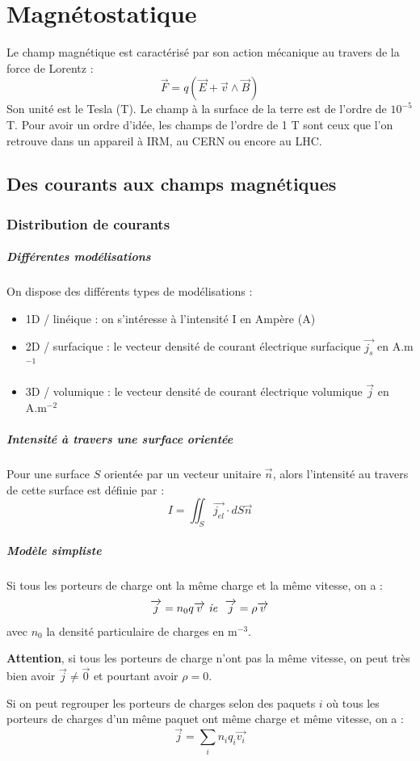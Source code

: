\documentclass[french]{book}
\theoremstyle{plain}
\theoremstyle{definition}
\theoremstyle{remark}
\newcommand{\inv}{^{-1}}
\begin{document}
\chapter{Magnétostatique}
\localtableofcontents
Le champ magnétique est caractérisé par son action mécanique au travers de la force de Lorentz : $$\overrightarrow{F}=q\left(\overrightarrow{E}+\overrightarrow{v}\wedge\overrightarrow{B}\right)$$ Son unité est le Tesla (T). Le champ à la surface de la terre est de l'ordre de $10^{-5}$ T. Pour avoir un ordre d'idée, les champs de l'ordre de 1 T sont ceux que l'on retrouve dans un appareil à IRM, au CERN ou encore au LHC.
\section{Des courants aux champs magnétiques}
\subsection{Distribution de courants}
\paragraph{Différentes modélisations}
On dispose des différents types de modélisations : 
\begin{itemize}
	\item 1D / linéique : on s'intéresse à l'intensité I en Ampère (A)
	\item 2D / surfacique : le vecteur densité de courant électrique surfacique $\overrightarrow{j_s}$ en A.m$\inv$
	\item 3D / volumique : le vecteur densité de courant électrique volumique $\overrightarrow{j}$ en A.m$^{-2}$
\end{itemize}
\paragraph{Intensité à travers une surface orientée} Pour une surface $S$ orientée par un vecteur unitaire $\overrightarrow{n}$, alors l'intensité au travers de cette surface est définie par :
$$I=\iint_S\overrightarrow{j_{el}}\cdot dS\overrightarrow{n}$$
\paragraph{Modèle simpliste} Si tous les porteurs de charge ont la même charge et la même vitesse, on a : $$\overrightarrow{j}=n_0q\overrightarrow{v} \ \text{\textit{ie}}\ \ \overrightarrow{j}=\rho\overrightarrow{v}$$ avec $n_0$ la densité particulaire de charges en m$^{-3}$.  \\ \par \textbf{Attention}, si tous les porteurs de charge n'ont pas la même vitesse, on peut très bien avoir $\overrightarrow{j}\ne\overrightarrow{0}$ et pourtant avoir $\rho=0$. \\ \par Si on peut regrouper les porteurs de charges selon des paquets $i$ où tous les porteurs de charges d'un même paquet ont même charge et même vitesse, on a : $$\overrightarrow{j}=\sum_i n_iq_i\overrightarrow{v_i}$$
\end{document}
